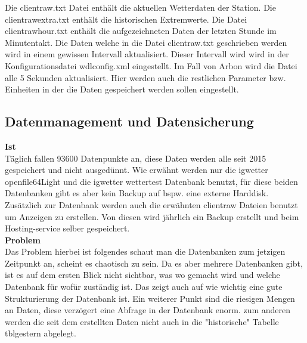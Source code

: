 Die clientraw.txt Datei enthält die aktuellen Wetterdaten der Station.  Die clientrawextra.txt enthält die historischen Extremwerte. Die Datei clientrawhour.txt enthält die aufgezeichneten Daten der letzten Stunde im Minutentakt.\cite{WeatherDisplay} 
Die Daten welche in die Datei clientraw.txt geschrieben werden wird in einem gewissen Intervall aktualisiert. Dieser Intervall wird wird in der Konfigurationsdatei wdlconfig.xml eingestellt. Im Fall von Arbon wird die Datei alle 5 Sekunden aktualisiert. Hier werden auch die restlichen Parameter bzw. Einheiten in der die Daten gespeichert werden sollen eingestellt.\\


\subsection{Datenmanagement und Datensicherung}
\textbf{Ist}\\
Täglich fallen 93600 Datenpunkte an, diese Daten werden alle seit 2015 gespeichert und nicht ausgedünnt. Wie erwähnt werden nur die igwetter openfile64Light und die igwetter wettertest Datenbank benutzt, für diese beiden Datenbanken gibt es aber kein Backup auf bspw. eine externe Harddisk. Zusätzlich zur Datenbank werden auch die erwähnten clientraw Dateien benutzt um Anzeigen zu erstellen. Von diesen wird jährlich ein Backup erstellt und beim Hosting-service selber gespeichert.\\
\textbf{Problem}\\
Das Problem hierbei ist folgendes schaut man die Datenbanken zum jetzigen Zeitpunkt an, scheint es chaotisch zu sein. Da es aber mehrere Datenbanken gibt,  ist es auf dem ersten Blick nicht sichtbar, was wo gemacht wird und welche Datenbank für wofür zuständig ist.
Das zeigt auch auf wie wichtig eine gute Strukturierung der Datenbank ist.  Ein weiterer Punkt sind die riesigen Mengen an Daten, diese verzögert eine Abfrage in der Datenbank enorm. zum anderen werden die seit dem erstellten Daten nicht auch in die "historische" Tabelle tblgestern abgelegt.


